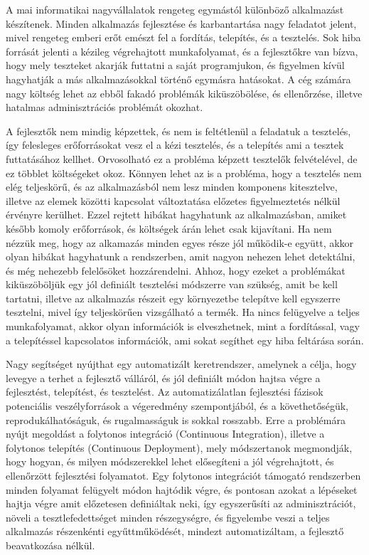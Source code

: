 \documentclass[11pt,magyar,a4paper,twoside,]{report}
\begin{document}
A mai informatikai nagyvállalatok rengeteg egymástól különböző
alkalmazást készítenek. Minden alkalmazás fejlesztése és karbantartása
nagy feladatot jelent, mivel rengeteg emberi erőt emészt fel a fordítás,
telepítés, és a tesztelés. Sok hiba forrását jelenti a kézileg
végrehajtott munkafolyamat, és a fejlesztőkre van bízva, hogy mely
teszteket akarják futtatni a saját programjukon, és figyelmen kívül
hagyhatják a más alkalmazásokkal történő egymásra hatásokat. A cég
számára nagy költség lehet az ebből fakadó problémák kiküszöbölése, és
ellenőrzése, illetve hatalmas adminisztrációs problémát okozhat.

A fejlesztők nem mindig képzettek, és nem is feltétlenül a feladatuk a
tesztelés, így felesleges erőforrásokat vesz el a kézi tesztelés, és a
telepítés ami a tesztek futtatásához kellhet. Orvosolható ez a probléma
képzett tesztelők felvételével, de ez többlet költségeket okoz. Könnyen
lehet az is a probléma, hogy a tesztelés nem elég teljeskörű, és az
alkalmazásból nem lesz minden komponens kitesztelve, illetve az elemek
közötti kapcsolat változtatása előzetes figyelmeztetés nélkül érvényre
kerülhet. Ezzel rejtett hibákat hagyhatunk az alkalmazásban, amiket
később komoly erőforrások, és költségek árán lehet csak kijavítani. Ha
nem nézzük meg, hogy az alkamazás minden egyes része jól működik-e
együtt, akkor olyan hibákat hagyhatunk a rendszerben, amit nagyon
nehezen lehet detektálni, és még nehezebb felelősöket hozzárendelni.
Ahhoz, hogy ezeket a problémákat kiküszöböljük egy jól definiált
tesztelési módszerre van szükség, amit be kell tartatni, illetve az
alkalmazás részeit egy környezetbe telepítve kell egyszerre tesztelni,
mivel így teljeskörűen vizsgálható a termék. Ha nincs felügyelve a
teljes munkafolyamat, akkor olyan információk is elveszhetnek, mint a
fordítással, vagy a telepítéssel kapcsolatos információk, ami sokat
segíthet egy hiba feltárása során.

Nagy segítséget nyújthat egy automatizált keretrendszer, amelynek a
célja, hogy levegye a terhet a fejlesztő válláról, és jól definiált
módon hajtsa végre a fejlesztést, telepítést, és tesztelést. Az
automatizálatlan fejlesztési fázisok potenciális veszélyforrások a
végeredmény szempontjából, és a követhetőségük, reprodukálhatóságuk, és
rugalmasságuk is sokkal rosszabb. Erre a problémára nyújt megoldást a
folytonos integráció (Continuous Integration), illetve a folytonos
telepítés (Continuous Deployment), mely módszertanok megmondják, hogy
hogyan, és milyen módszerekkel lehet elősegíteni a jól végrehajtott, és
ellenőrzött fejlesztési folyamatot. Egy folytonos integrációt támogató
rendszerben minden folyamat felügyelt módon hajtódik végre, és pontosan
azokat a lépéseket hajtja végre amit előzetesen definiáltak neki, így
egyszerűsíti az adminisztrációt, növeli a tesztlefedettséget minden
részegységre, és figyelembe veszi a teljes alkalmazás részenkénti
egyűttműködését, mindezt automatizáltam, a fejlesztő beavatkozása
nélkül.
\end{document}
